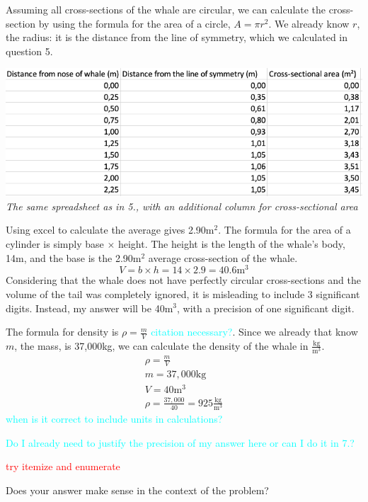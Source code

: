 \documentclass[fleqn]{article}
\newcommand{\unit}[1]{\ensuremath{\mathrm{#1}}}
\newcommand\todo[1]{\textcolor{red}{#1}}
\newcommand\ask[1]{\textcolor{cyan}{#1}}
\begin{document}
\begin{enumerate}
  Assuming all cross-sections of the whale are circular, we can calculate the cross-section by using the formula for the area of a circle, $A=\pi r^2$. We already know $r$, the radius: it is the distance from the line of symmetry, which we calculated in question 5.

  \includegraphics[scale=0.4]{spreadsheet_with_cross.png} \\
  \textit{\small The same spreadsheet as in 5., with an additional column for cross-sectional area}

  Using excel to calculate the average gives 2.90m$^{2}$. The formula for the area of a cylinder is simply base $\times$ height. The height is the length of the whale's body, 14m, and the base is the 2.90m$^2$ average cross-section of the whale.
  \[
  V = b \times h = 14 \times 2.9 = 40.6 \unit{m^{3}}
  \]
  Considering that the whale does not have perfectly circular cross-sections and the volume of the tail was completely ignored, it is misleading to include 3 significant digits. Instead, my answer will be 40m$^3$, with a precision of one significant digit.

  The formula for density is $\rho = \frac{m}{V}$ \ask{citation necessary?}. Since we already that know $m$, the mass, is 37,000kg, we can calculate the density of the whale in $\frac{\unit{kg}}{\unit{m^3}}$.
  \begin{gather*}
    \rho = \frac{m}{V} \\
    m = 37,000\unit{kg} \\
    V = 40\unit{m^3} \\
    \rho = \frac{37,000}{40} = 925\frac{\unit{kg}}{\unit{m^3}}
  \end{gather*}
  \ask{when is it correct to include units in calculations?}

  \ask{Do I already need to justify the precision of my answer here or can I do it in 7.?}

  \todo{try itemize and enumerate}

  Does your answer make sense in the context of the problem?


\end{enumerate}
\end{document}
